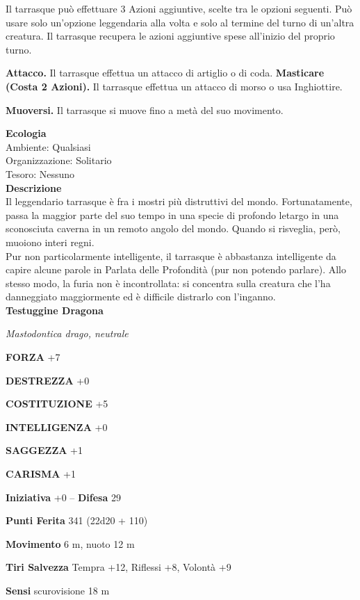 \begin{multicols}{2}
Il tarrasque può effettuare 3 Azioni aggiuntive, scelte tra le opzioni seguenti. Può usare solo un'opzione leggendaria alla volta e solo al termine del turno di un'altra creatura. Il tarrasque recupera le azioni aggiuntive spese all'inizio del proprio turno.

\textbf{Attacco.} Il tarrasque effettua un attacco di artiglio o di coda. \textbf{Masticare (Costa 2 Azioni).} Il tarrasque effettua un attacco di morso o usa Inghiottire.

\textbf{Muoversi.} Il tarrasque si muove fino a metà del suo movimento.


\textbf{Ecologia}\\
Ambiente: Qualsiasi\\
Organizzazione: Solitario\\
Tesoro: Nessuno\\
\textbf{Descrizione}\\
Il leggendario tarrasque è fra i mostri più distruttivi del mondo. Fortunatamente, passa la maggior parte del suo tempo in una specie di profondo letargo in una sconosciuta caverna in un remoto angolo del mondo. Quando si risveglia, però, muoiono interi regni.\\
Pur non particolarmente intelligente, il tarrasque è abbastanza intelligente da capire alcune parole in Parlata delle Profondità (pur non potendo parlare). Allo stesso modo, la furia non è incontrollata: si concentra sulla creatura che l'ha danneggiato maggiormente ed è difficile distrarlo con l'inganno.\\


\medskip{}\textbf{Testuggine Dragona}

\emph{Mastodontica drago, neutrale}

\textbf{FORZA} +7

\textbf{DESTREZZA} +0

\textbf{COSTITUZIONE} +5

\textbf{INTELLIGENZA} +0

\textbf{SAGGEZZA} +1

\textbf{CARISMA} +1

\textbf{Iniziativa} +0 -- \textbf{Difesa} 29

\textbf{Punti Ferita} 341 (22d20 + 110) 

\textbf{Movimento} 6 m, nuoto 12 m

\textbf{Tiri Salvezza} Tempra +12, Riflessi +8, Volontà +9

\textbf{Sensi} scurovisione 18 m


\end{multicols}
